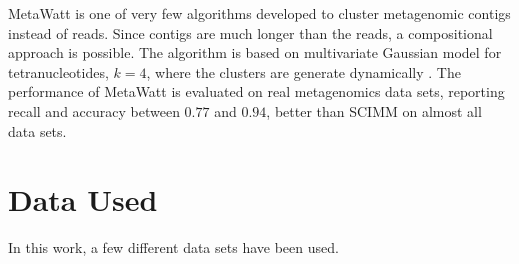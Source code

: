 MetaWatt is one of very few algorithms developed to cluster metagenomic contigs instead of reads. Since contigs are much longer than the reads, a compositional approach is possible. The algorithm is based on multivariate Gaussian model for tetranucleotides, $k=4$, where the clusters are generate dynamically \parencite{Strous2012a}. The performance of MetaWatt is evaluated on real metagenomics data sets, reporting recall and accuracy between $0.77$ and $0.94$, better than SCIMM on almost all data sets. 

\section{Data Used}
In this work, a few different data sets have been used.
